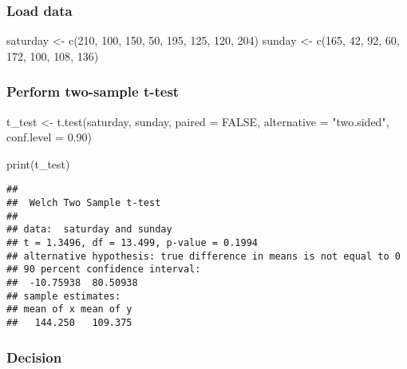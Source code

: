 \documentclass[
]{article}
\newenvironment{Shaded}{\begin{snugshade}}{\end{snugshade}}
\newcommand{\AttributeTok}[1]{\textcolor[rgb]{0.77,0.63,0.00}{#1}}
\newcommand{\ConstantTok}[1]{\textcolor[rgb]{0.00,0.00,0.00}{#1}}
\newcommand{\DecValTok}[1]{\textcolor[rgb]{0.00,0.00,0.81}{#1}}
\newcommand{\FloatTok}[1]{\textcolor[rgb]{0.00,0.00,0.81}{#1}}
\newcommand{\FunctionTok}[1]{\textcolor[rgb]{0.00,0.00,0.00}{#1}}
\newcommand{\NormalTok}[1]{#1}
\newcommand{\OtherTok}[1]{\textcolor[rgb]{0.56,0.35,0.01}{#1}}
\newcommand{\StringTok}[1]{\textcolor[rgb]{0.31,0.60,0.02}{#1}}
\begin{document}
\hypertarget{load-data-13}{%
\subsubsection{Load data}\label{load-data-13}}

\begin{Shaded}
\begin{Highlighting}[]
\NormalTok{saturday }\OtherTok{\textless{}{-}} \FunctionTok{c}\NormalTok{(}\DecValTok{210}\NormalTok{, }\DecValTok{100}\NormalTok{, }\DecValTok{150}\NormalTok{, }\DecValTok{50}\NormalTok{, }\DecValTok{195}\NormalTok{, }\DecValTok{125}\NormalTok{, }\DecValTok{120}\NormalTok{, }\DecValTok{204}\NormalTok{)}
\NormalTok{sunday }\OtherTok{\textless{}{-}} \FunctionTok{c}\NormalTok{(}\DecValTok{165}\NormalTok{, }\DecValTok{42}\NormalTok{, }\DecValTok{92}\NormalTok{, }\DecValTok{60}\NormalTok{, }\DecValTok{172}\NormalTok{, }\DecValTok{100}\NormalTok{, }\DecValTok{108}\NormalTok{, }\DecValTok{136}\NormalTok{)}
\end{Highlighting}
\end{Shaded}

\hypertarget{perform-two-sample-t-test}{%
\subsubsection{Perform two-sample
t-test}\label{perform-two-sample-t-test}}

\begin{Shaded}
\begin{Highlighting}[]
\NormalTok{t\_test }\OtherTok{\textless{}{-}} \FunctionTok{t.test}\NormalTok{(saturday, sunday, }\AttributeTok{paired =} \ConstantTok{FALSE}\NormalTok{, }\AttributeTok{alternative =} \StringTok{"two.sided"}\NormalTok{, }\AttributeTok{conf.level =} \FloatTok{0.90}\NormalTok{)}

\FunctionTok{print}\NormalTok{(t\_test)}
\end{Highlighting}
\end{Shaded}

\begin{verbatim}
## 
##  Welch Two Sample t-test
## 
## data:  saturday and sunday
## t = 1.3496, df = 13.499, p-value = 0.1994
## alternative hypothesis: true difference in means is not equal to 0
## 90 percent confidence interval:
##  -10.75938  80.50938
## sample estimates:
## mean of x mean of y 
##   144.250   109.375
\end{verbatim}

\hypertarget{decision-1}{%
\subsubsection{Decision}\label{decision-1}}
\end{document}
